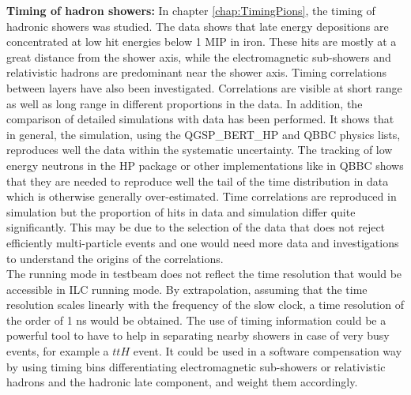 \noindent\textbf{Timing of hadron showers:} In chapter \ref{chap:TimingPions}, the timing of hadronic showers was studied. The data shows that late energy depositions are concentrated at low hit energies below 1 MIP in iron. These hits are mostly at a great distance from the shower axis, while the electromagnetic sub-showers and relativistic hadrons are predominant near the shower axis. Timing correlations between layers have also been investigated. Correlations are visible at short range as well as long range in different proportions in the data. In addition, the comparison of detailed simulations with data has been performed. It shows that in general, the simulation, using the QGSP\_BERT\_HP and QBBC physics lists, reproduces well the data within the systematic uncertainty. The tracking of low energy neutrons in the HP package or other implementations like in QBBC shows that they are needed to reproduce well the tail of the time distribution in data which is otherwise generally over-estimated. Time correlations are reproduced in simulation but the proportion of hits in data and simulation differ quite significantly. This may be due to the selection of the data that does not reject efficiently multi-particle events and one would need more data and investigations to understand the origins of the correlations.\\[0.1cm]

The running mode in testbeam does not reflect the time resolution that would be accessible in ILC running mode. By extrapolation, assuming that the time resolution scales linearly with the frequency of the slow clock, a time resolution of the order of 1 ns would be obtained. The use of timing information could be a powerful tool to have to help in separating nearby showers in case of very busy events, for example a $ttH$ event. It could be used in a software compensation way by using timing bins differentiating electromagnetic sub-showers or relativistic hadrons and the hadronic late component, and weight them accordingly.
